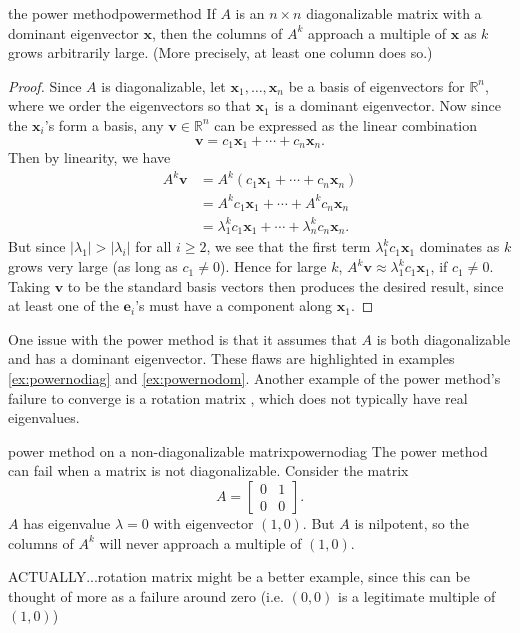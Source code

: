 \documentclass{article}
\let\vec\mathbf
\begin{document}
\begin{theorem}{the power method}{powermethod}
  If $A$ is an $n \times n$ diagonalizable matrix with a dominant eigenvector $\vec{x}$, then the columns of $A^k$ approach a multiple of $\vec{x}$ as $k$ grows arbitrarily large. (More precisely, at least one column does so.)
\end{theorem}
\begin{proof}
  Since $A$ is diagonalizable, let $\vec{x}_1, \ldots, \vec{x}_n$ be a basis of eigenvectors for $\mathbb{R}^n$, where we order the eigenvectors so that $\vec{x}_1$ is a dominant eigenvector. Now since the $\vec{x}_i$'s form a basis, any $\vec{v} \in \mathbb{R}^n$ can be expressed as the linear combination
  \begin{equation*}
    \vec{v} = c_1\vec{x}_1 + \cdots + c_n\vec{x}_n.
  \end{equation*}
  Then by linearity, we have
  \begin{align*}
    A^k\vec{v} &= A^k(c_1\vec{x}_1 + \cdots + c_n\vec{x}_n) \\
               &= A^kc_1\vec{x}_1 + \cdots + A^kc_n\vec{x}_n \\
               &= \lambda_1^kc_1\vec{x}_1 + \cdots + \lambda_n^kc_n\vec{x}_n.
  \end{align*}
  But since $|\lambda_1| > |\lambda_i|$ for all $i \geq 2$, we see that the first term $\lambda_1^kc_1\vec{x}_1$ dominates as $k$ grows very large (as long as $c_1 \neq 0$). Hence for large $k$, $A^k\vec{v} \approx \lambda_1^kc_1\vec{x}_1$, if $c_1 \neq 0$. Taking $\vec{v}$ to be the standard basis vectors then produces the desired result, since at least one of the $\vec{e}_i$'s must have a component along $\vec{x}_1$.
\end{proof}

One issue with the power method is that it assumes that $A$ is both diagonalizable and has a dominant eigenvector. These flaws are highlighted in examples \ref{ex:powernodiag} and \ref{ex:powernodom}. Another example of the power method's failure to converge is a rotation matrix \cite{pwr-rot}, which does not typically have real eigenvalues.

\begin{example}{power method on a non-diagonalizable matrix}{powernodiag}
  The power method can fail when a matrix is not diagonalizable. Consider the matrix
  \begin{equation*}
    A = \begin{bmatrix}0 & 1 \\ 0 & 0\end{bmatrix}.
  \end{equation*}
  $A$ has eigenvalue $\lambda = 0$ with eigenvector $(1, 0)$. But $A$ is nilpotent, so the columns of $A^k$ will never approach a multiple of $(1, 0)$.

  ACTUALLY...rotation matrix might be a better example, since this can be thought of more as a failure around zero (i.e. $(0,0)$ is a legitimate multiple of $(1,0)$)
\end{example}
\end{document}
